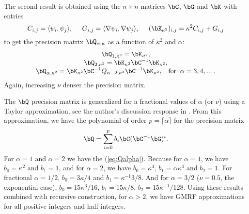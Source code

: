 The second result is obtained using the $n\times n$ matrices 
$\bC$, $\bG$ and $\bK$ with entries 
\begin{equation}
C_{i,j} = \langle \psi_i, \psi_j\rangle, \;\;\;\;\;
G_{i,j} = \langle \nabla \psi_i, \nabla \psi_j \rangle, \;\;\;\;\;
(\bK_{\kappa^2})_{i,j} = \kappa^2 C_{i,j} + G_{i,j}
\end{equation}
to get the precision matrix $\bQ_{\alpha,\kappa}$ 
as a function of $\kappa^2$ and $\alpha$: 
\begin{equation}\label{eq:Qalpha}\begin{array}{c}
\bQ_{1,\kappa^2} = \bK_{\kappa^2}, \\
\bQ_{2,\kappa^2} = \bK_{\kappa^2}\bC^{-1}\bK_{\kappa^2}, \\
\bQ_{\alpha,\kappa^2} = \bK_{\kappa^2}\bC^{-1}Q_{\alpha-2,\kappa^2}\bC^{-1}\bK_{\kappa^2}, 
\;\;\;\mbox{for} \;\;\alpha = 3,4,...\;.
\end{array}\end{equation}
Again, increasing $\nu$ denser the precision matrix. 

The $\bQ$ precision matrix is generalized for a fractional values 
of $\alpha$ (or $\nu$) using a Taylor approximation, 
see the author's discussion response in \cite{lindgrenRL:2011}. 
From this approximation, we have the polynomial of 
order $p=\lceil \alpha \rceil$ for the precision matrix 
\begin{equation}\label{eq:Qfrac}
\bQ = \sum_{i=0}^p b_i \bC(\bC^{-1}\bG)^i.
\end{equation}
For $\alpha=1$ and $\alpha=2$ we have the (\ref{eq:Qalpha}). 
Because for $\alpha=1$, we have $b_0=\kappa^2$ and $b_1=1$, 
and for $\alpha=2$, we have $b_0=\kappa^4$, 
$b_1=\alpha\kappa^4$ and $b_2=1$. 
For fractional $\alpha=1/2$, 
$b_0=3\kappa/4$ and $b_1=\kappa^{-1}3/8$. 
And for $\alpha=3/2$ ($\nu=0.5$, the exponential case), 
$b_0=15\kappa^3/16$, $b_1=15\kappa/8$, 
$b_2=15\kappa^{-1}/128$. 
Using these results combined with recursive construction, 
for $\alpha>2$, we have GMRF approximations for all positive 
integers and half-integers. 

